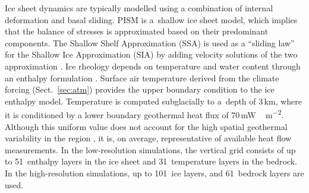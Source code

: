 \documentclass[tc]{copernicus}
\begin{document}
Ice sheet dynamics are typically modelled using a combination of internal
deformation and basal sliding. PISM is a~shallow ice sheet model, which implies
that the balance of stresses is approximated based on their predominant
components. The Shallow Shelf Approximation (SSA) is used as a ``sliding law''
for the Shallow Ice Approximation (SIA) by adding velocity solutions of the
two approximation
\citep[Eqns.~7--9 and 15]{Bueler.Brown.2009, Winkelmann.etal.2011}.
Ice rheology depends on temperature and water content through an enthalpy
formulation \citep{Aschwanden.etal.2012}. Surface air temperature derived from
the climate forcing (Sect.~\ref{sec:atm}) provides the upper boundary
condition to the ice enthalpy model. Temperature is computed subglacially to
a~depth of 3\,km,
where it is conditioned by a lower boundary geothermal heat flux of
70\,\unit{mW\,m^{-2}}. Although this uniform value does not account for the
high spatial geothermal variability in the region
\citep{Blackwell.Richards.2004}, it is, on average, representative of available
heat flow measurements. In the low-resolution simulations, the vertical grid
consists of up to 51~enthalpy layers in the ice sheet and 31~temperature layers
in the bedrock. In the high-resolution simulations, up to 101~ice layers, and
61~bedrock layers are used.
\end{document}
